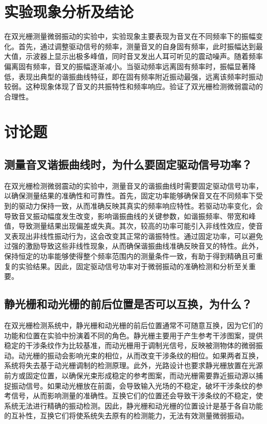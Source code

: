 \documentclass{ctexart}
\begin{document}
\section{实验现象分析及结论}

在双光栅测量微弱振动的实验中，实验现象主要表现为音叉在不同频率下的振幅变化。首先，通过调整驱动信号的频率，测量音叉的自身固有频率，此时振幅达到最大值，示波器上显示出极多峰值，同时音叉发出人耳可听见的震动噪声。随着频率偏离固有频率，音叉的振幅逐渐减小。当驱动频率远离固有频率时，振幅显著降低，表现出典型的谐振曲线特征，即在固有频率附近振动最强，远离该频率时振动较弱。这种现象体现了音叉的共振特性和频率响应。验证了双光栅检测微弱震动的合理性。

\section{讨论题}

\subsection{测量音叉谐振曲线时，为什么要固定驱动信号功率？}

在双光栅检测微弱震动的实验中，测量音叉的谐振曲线时需要固定驱动信号功率，以确保测量结果的准确性和可靠性。首先，固定功率能够确保音叉在不同频率下受到的驱动力保持一致，从而准确反映其真实的频率响应特性。若驱动功率变化，会导致音叉振动幅度发生改变，影响谐振曲线的关键参数，如谐振频率、带宽和峰值，导致测量结果出现偏差或失真。其次，较高的功率可能引入非线性效应，使音叉表现出非线性振动行为，这会改变其正常的谐振特性。通过固定功率，可以避免过强的激励导致这些非线性现象，从而确保谐振曲线准确反映音叉的特性。此外，保持恒定的功率能够使得整个频率范围内的测量条件一致，有助于得到精确且可重复的实验结果。因此，固定驱动信号功率对于微弱振动的准确检测和分析至关重要。

\subsection{静光栅和动光栅的前后位置是否可以互换，为什么？}

在双光栅检测系统中，静光栅和动光栅的前后位置通常不可随意互换，因为它们的功能和位置在实验中扮演着不同的角色。静光栅主要用于产生参考干涉图案，提供稳定的干涉条纹作为比较基准，而动光栅用于调制光信号，反映被测物体的微弱振动。动光栅的振动会影响光束的相位，从而改变干涉条纹的相位。如果两者互换，系统将失去基于动光栅调制的检测原理。此外，光路设计也要求静光栅放置在光源前方或固定位置，以确保光束形成稳定的参考图案，而动光栅需要靠近振动源以捕捉振动信号。如果动光栅放在前面，会导致输入光场的不稳定，破坏干涉条纹的参考信号，从而影响测量的准确性。互换它们的位置还会导致干涉条纹的不稳定，使系统无法进行精确的振动检测。因此，静光栅和动光栅的位置设计是基于各自功能的互补性，互换它们将使系统失去原有的检测能力，无法有效测量微弱振动。
\end{document}
